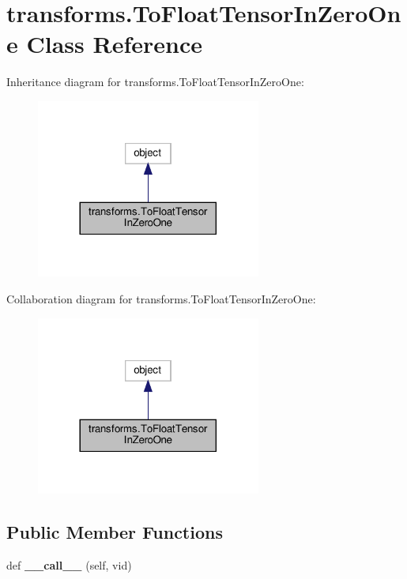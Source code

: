 \hypertarget{classtransforms_1_1ToFloatTensorInZeroOne}{}\section{transforms.\+To\+Float\+Tensor\+In\+Zero\+One Class Reference}
\label{classtransforms_1_1ToFloatTensorInZeroOne}


Inheritance diagram for transforms.\+To\+Float\+Tensor\+In\+Zero\+One\+:
\nopagebreak
\begin{figure}[H]
\begin{center}
\leavevmode
\includegraphics[width=209pt]{classtransforms_1_1ToFloatTensorInZeroOne__inherit__graph}
\end{center}
\end{figure}


Collaboration diagram for transforms.\+To\+Float\+Tensor\+In\+Zero\+One\+:
\nopagebreak
\begin{figure}[H]
\begin{center}
\leavevmode
\includegraphics[width=209pt]{classtransforms_1_1ToFloatTensorInZeroOne__coll__graph}
\end{center}
\end{figure}
\subsection*{Public Member Functions}
\begin{DoxyCompactItemize}
\item 
\mbox{\label{classtransforms_1_1ToFloatTensorInZeroOne_aa60b4a1391e740003994e4da5ce5d0e6}} 
def {\bfseries \+\_\+\+\_\+call\+\_\+\+\_\+} (self, vid)
\end{DoxyCompactItemize}


